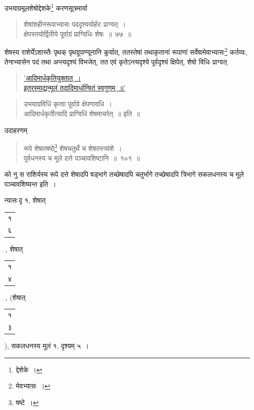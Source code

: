 \documentclass[10pt, openany]{book}
\begin{document}
{\newpage

{उभयाग्रमूलशेषोद्देशके\renewcommand{\thefootnote}{\s १}\footnote{\s *द्देशेके~।}  करणसूत्रमार्या\textemdash}

 \label{77}
\begin{quote}
{\bs शेषांशहीनरूपाभ्यासः पददृश्ययोर्हरः प्राग्वत्~। \\
 क्षेपस्तयोर्द्वितीये पूर्वाग्रं प्राग्विधिः शेषः~॥~७७~॥}\end{quote}

{शेषस्य राशेर्येंऽशास्तैः पृथक् पृथग्रूपाण्यूनानि कुर्यात्, ततस्तेषां
तथाकृतानां रूपाणां}
{सर्वेषामेवाभ्यासः\renewcommand{\thefootnote}{\s २}\footnote{\s *मेवभ्यासः~।} कर्तव्यः, तेनाभ्यासेन पदं तथा अन्त्यदृश्यं
विभजेत्, तत एवं कृतेऽन्त्यदृश्ये}
{पूर्वदृश्यं क्षिपेत्, शेषो विधिः प्राग्वत्\textendash}

\begin{quote}
\hspace{25mm} \hyperref[76]{'आदिमार्धकृतियुक्तात्~। \\
इतरस्माद्यन्मूलं तदादिमार्धान्वितं स्वगुणम्~॥'}
\end{quote}


\begin{quote}
{\qt उभयाग्रविधिं कृत्वा पूर्वाग्रे क्षेपणावधि~। \\
 आदिमार्धकृतीत्यादि प्राग्विधिं शेषमाचरेत्~॥} इति~॥
\end{quote}

{उदाहरणम्\textemdash}

\begin{quote}
{\eg रूपे शेषात्षष्ठे\renewcommand{\thefootnote}{\s ४}\footnote{\s *षष्टे~।} शेषचतुर्थे च शेषतस्त्र्यंशे~। \\
 पूर्वधनस्य च मूले दत्ते पञ्चावशिष्टानि~॥~१०१~॥}
\end{quote}

{को नु स राशिर्यस्य रूपे दत्ते शेषादपि षड्भागे तच्छेषादपि चतुर्भागे
तच्छेषादपि}
{त्रिभागे सकलधनस्य च मूले पञ्चावशिष्यन्त इति~।}
\vspace{3mm}

{न्यासः\textendash \,दृ १, शेषात् \begin{tabular}{|r|}
१\\
६\\
\hline
\end{tabular}\,, शेषात् \begin{tabular}{|r|}
१ \\ 
४\\ \hline 
\end{tabular}\,, \bigg(शेषात् \begin{tabular}{r}
१ \\
३
\end{tabular}\bigg), सकलधनस्य मूलं १,
दृश्यम् ५~। 
\vspace{3mm}

}}
\end{document}
